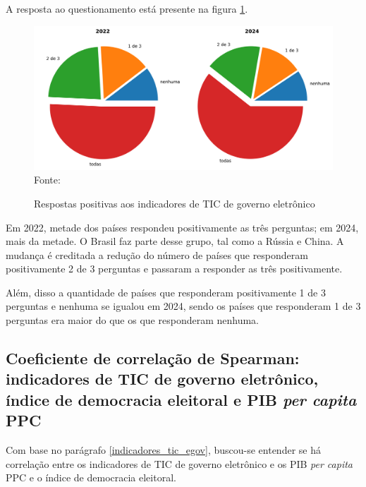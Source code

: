 A resposta ao questionamento está presente na figura \ref{fig:indicators_answer}.

\begin{figure}[H]
	\centering
	\caption{Respostas positivas aos indicadores de TIC de governo eletrônico}
	\includegraphics[width=1\linewidth]{figuras/ict_in_government/indicators_answer}
	\label{fig:indicators_answer}
	\footnotesize{Fonte: \cite{ONU_ICT_in_government_indicators}}
\end{figure}

Em 2022, metade dos países respondeu positivamente as três perguntas; em 2024, mais da metade. O Brasil faz parte desse grupo, tal como a Rússia e China. A mudança é creditada a redução do número de países que responderam positivamente 2 de 3 perguntas e passaram a responder as três positivamente. 

Além, disso a quantidade de países que responderam positivamente 1 de 3 perguntas e nenhuma se igualou em 2024, sendo os países que responderam 1 de 3 perguntas era maior do que os que responderam nenhuma.

\subsection{Coeficiente de correlação de Spearman: indicadores de TIC de governo eletrônico, índice de democracia eleitoral e PIB \textit{per capita} PPC}


Com base no parágrafo \ref{indicadores_tic_egov}, buscou-se entender se há correlação entre os indicadores de TIC de governo eletrônico e os PIB \textit{per capita} PPC e o índice de democracia eleitoral.

